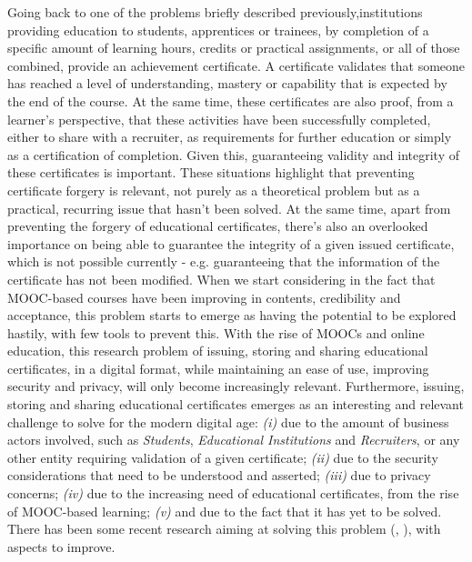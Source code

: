 Going back to one of the problems briefly described previously,institutions providing education to students, apprentices or trainees, by completion of a specific amount of learning hours, credits or practical assignments, or all of those combined, provide an achievement certificate. A certificate validates that someone has reached a level of understanding, mastery or capability that is expected by the end of the course. At the same time, these certificates are also proof, from a learner's perspective, that these activities have been successfully completed, either to share with a recruiter, as requirements for further education or simply as a certification of completion. Given this, guaranteeing validity and integrity of these certificates is important. These situations highlight that preventing certificate forgery is relevant, not purely as a theoretical problem but as a practical, recurring issue that hasn't been solved. At the same time, apart from preventing the forgery of educational certificates, there's also an overlooked importance on being able to guarantee the integrity of a given issued certificate, which is not possible currently - e.g. guaranteeing that the information of the certificate has not been modified. When we start considering in the fact that MOOC-based courses have been improving in contents, credibility and acceptance, this problem starts to emerge as having the potential to be explored hastily, with few tools to prevent this. With the rise of MOOCs and online education, this research problem of issuing, storing and sharing educational certificates, in a digital format, while maintaining an ease of use, improving security and privacy, will only become increasingly relevant. Furthermore, issuing, storing and sharing educational certificates emerges as an interesting and relevant challenge to solve for the modern digital age: \emph{(i)} due to the amount of business actors involved, such as \textit{Students}, \textit{Educational Institutions} and \textit{Recruiters}, or any other entity requiring validation of a given certificate; \emph{(ii)} due to the security considerations that need to be understood and asserted; \emph{(iii)} due to privacy concerns; \emph{(iv)} due to the increasing need of educational certificates, from the rise of MOOC-based learning; \emph{(v)} and due to the fact that it has yet to be solved. There has been some recent research aiming at solving this problem (\cite{MITCertificates}, \cite{Blockcerts}), with aspects to improve.

